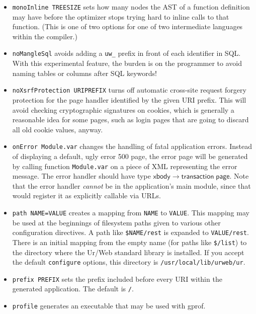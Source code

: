 \documentclass{article}
\newcommand{\mt}[1]{\mathsf{#1}}
\begin{document}
\begin{itemize}
\item \texttt{monoInline TREESIZE} sets how many nodes the AST of a function definition may have before the optimizer stops trying hard to inline calls to that function.  (This is one of two options for one of two intermediate languages within the compiler.)
\item \texttt{noMangleSql} avoids adding a \texttt{uw\_} prefix in front of each identifier in SQL.  With this experimental feature, the burden is on the programmer to avoid naming tables or columns after SQL keywords!
\item \texttt{noXsrfProtection URIPREFIX} turns off automatic cross-site request forgery protection for the page handler identified by the given URI prefix.  This will avoid checking cryptographic signatures on cookies, which is generally a reasonable idea for some pages, such as login pages that are going to discard all old cookie values, anyway.
\item \texttt{onError Module.var} changes the handling of fatal application errors.  Instead of displaying a default, ugly error 500 page, the error page will be generated by calling function \texttt{Module.var} on a piece of XML representing the error message.  The error handler should have type $\mt{xbody} \to \mt{transaction} \; \mt{page}$.  Note that the error handler \emph{cannot} be in the application's main module, since that would register it as explicitly callable via URLs.
\item \texttt{path NAME=VALUE} creates a mapping from \texttt{NAME} to \texttt{VALUE}.  This mapping may be used at the beginnings of filesystem paths given to various other configuration directives.  A path like \texttt{\$NAME/rest} is expanded to \texttt{VALUE/rest}.  There is an initial mapping from the empty name (for paths like \texttt{\$/list}) to the directory where the Ur/Web standard library is installed.  If you accept the default \texttt{configure} options, this directory is \texttt{/usr/local/lib/urweb/ur}.
\item \texttt{prefix PREFIX} sets the prefix included before every URI within the generated application.  The default is \texttt{/}.
\item \texttt{profile} generates an executable that may be used with gprof.

\end{itemize}
\end{document}
